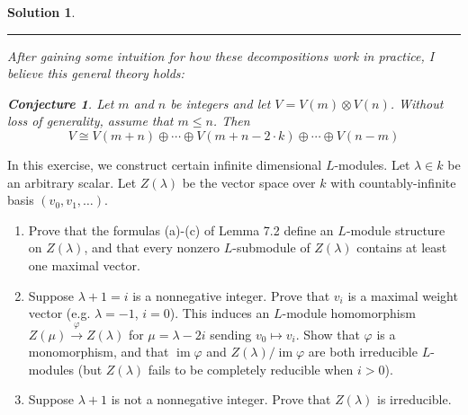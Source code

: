 \documentclass[12pt]{article}
\newenvironment{hwprob}[1]
{\renewcommand{\theprob}{#1}%
 \addtocounter{thm}{-1}%
 \begin{prob}}
{\end{prob}}
\theoremstyle{nonumberbreak}
\newtheorem{sol}{Solution}
\theoremstyle{changebreak}
\theoremstyle{nonumberbreak}
\newtheorem{conj}{Conjecture}
\theoremstyle{change}
\newcommand*{\brk}{
\rule{2in}{.1pt}
}
\DeclareMathOperator{\im}{im}
\begin{document}
\begin{sol}
	\brk

	After gaining some intuition for how these decompositions work in practice, I believe this general theory holds:
	\begin{conj}
		Let $m$ and $n$ be integers and let $V=V(m)\otimes V(n)$. Without loss of generality, assume that $m\le n$.
		Then 
		\[V\cong V(m+n)\oplus\cdots\oplus V(m+n-2\cdot k)\oplus\cdots\oplus V(n-m)\]
	\end{conj}
\end{sol}
\begin{hwprob}{7.7}
	In this exercise, we construct certain infinite dimensional $L$-modules. Let $\lambda\in k$ be
	an arbitrary scalar. Let $Z(\lambda)$ be the vector space over $k$ with countably-infinite basis $(v_0,v_1,\dots)$.
	\begin{enumerate}
		\item Prove that the formulas (a)-(c) of Lemma 7.2 define an $L$-module structure on $Z(\lambda)$, and that every nonzero $L$-submodule of $Z(\lambda)$
		contains at least one maximal vector.
		\item Suppose $\lambda+1=i$ is a nonnegative integer. Prove that $v_i$ is a maximal weight vector (e.g. $\lambda=-1$, $i=0$).
		This induces an $L$-module homomorphism $Z(\mu)\xrightarrow{\varphi}Z(\lambda)$ for $\mu=\lambda-2i$ sending $v_0\mapsto v_i$.
		Show that $\varphi$ is a monomorphism, and that $\im\varphi$ and $Z(\lambda)/\im\varphi$ are both irreducible $L$-modules
		(but $Z(\lambda)$ fails to be completely reducible when $i>0$).
		\item Suppose $\lambda+1$ is not a nonnegative integer. Prove that $Z(\lambda)$ is irreducible.
	\end{enumerate}
\end{hwprob}
\end{document}
